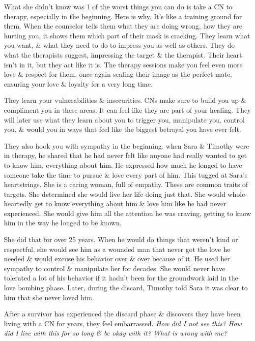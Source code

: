 \documentclass{article}
\numberwithin{equation}{section}
\begin{document}
What she didn't know was 1 of the worst things you can do is take a CN to therapy, especially in the beginning. Here is why. It's like a training ground for them. When the counselor tells them what they are doing wrong, how they are hurting you, it shows them which part of their mask is cracking. They learn what you want, \& what they need to do to impress you as well as others. They do what the therapists suggest, impressing the target \& the therapist. Their heart isn't in it, but they act like it is. The therapy sessions make you feel even more love \& respect for them, once again sealing their image as the perfect mate, ensuring your love \& loyalty for a very long time.

They learn your vulnerabilities \& insecurities. CNs make sure to build you up \& compliment you in these areas. It can feel like they are part of your healing. They will later use what they learn about you to trigger you, manipulate you, control you, \& would you in ways that feel like the biggest betrayal you have ever felt.

They also hook you with sympathy in the beginning. when Sara \& Timothy were in therapy, he shared that he had never felt like anyone had really wanted to get to know him, everything about him. He expressed how much he longed to have someone take the time to pursue \& love every part of him. This tugged at Sara's heartstrings. She is a caring woman, full of empathy. These are common traits of targets. She determined she would live her life doing just that. She would whole-heartedly get to know everything about him \& love him like he had never experienced. She would give him all the attention he was craving, getting to know him in the way he longed to be known.

She did that for over 25 years. When he would do things that weren't kind or respectful, she would see him as a wounded man that never got the love he needed \& would excuse his behavior over \& over because of it. He used her sympathy to control \& manipulate her for decades. She would never have tolerated a lot of his behavior if it hadn't been for the groundwork laid in the love bombing phase. Later, during the discard, Timothy told Sara it was clear to him that she never loved him.

After a survivor has experienced the discard phase \& discovers they have been living with a CN for years, they feel embarrassed. \textit{How did I not see this? How did I live with this for so long \& be okay with it? What is wrong with me?}
\end{document}

